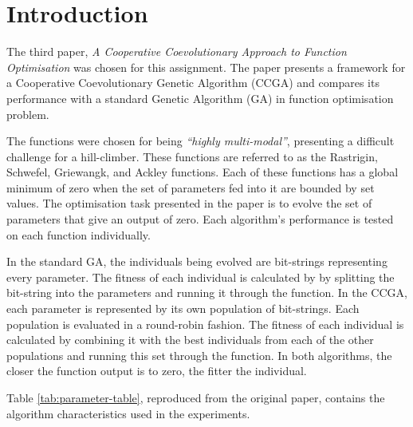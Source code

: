 \section{Introduction} \label{sec:introduction}

The third paper, \textit{A Cooperative Coevolutionary Approach to Function Optimisation}\cite{original-paper} was chosen for this assignment.
The paper presents a framework for a Cooperative Coevolutionary Genetic Algorithm (CCGA) and compares its performance with a standard Genetic Algorithm (GA) in function optimisation problem.

The functions were chosen for being \textit{``highly multi-modal''}, presenting a difficult challenge for a hill-climber.
These functions are referred to as the Rastrigin, Schwefel, Griewangk, and Ackley functions\cite{functions-1,functions-2,functions-3}.
Each of these functions has a global minimum of zero when the set of parameters fed into it are bounded by set values.
The optimisation task presented in the paper is to evolve the set of parameters that give an output of zero.
Each algorithm's performance is tested on each function individually.

In the standard GA, the individuals being evolved are bit-strings representing every parameter.
The fitness of each individual is calculated by by splitting the bit-string into the parameters and running it through the function.
In the CCGA, each parameter is represented by its own population of bit-strings.
Each population is evaluated in a round-robin fashion.
The fitness of each individual is calculated by combining it with the best individuals from each of the other populations and running this set through the function.
In both algorithms, the closer the function output is to zero, the fitter the individual.

Table \ref{tab:parameter-table}, reproduced from the original paper, contains the algorithm characteristics used in the experiments.

